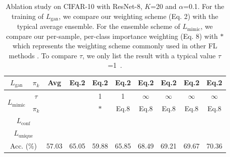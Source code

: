 \documentclass[letterpaper]{article} %
\newcommand{\cmark}{\ding{51}}%
\newcommand{\xmark}{\ding{55}}%
\begin{document}
\begin{table}[b]
\begin{center}
\resizebox{\columnwidth}{!}
{
\begin{tabular}{cc|cccccccc}

\hline
$L_\text{gan}$  &$\pi_k$ &Avg &Eq.2 &Eq.2 &Eq.2 &Eq.2 &Eq.2 &Eq.2 &Eq.2\\ \hline
\multirow{2}{*}{$L_\text{mimic}$} &$\tau$ &\multirow{2}{*}{\xmark} &\multirow{2}{*}{\xmark} &1 & 1 &$\infty$ &$\infty$ &$\infty$ &$\infty$\\
&$\pi_k$ & &  &$*$ &Eq.8 &Eq.8 &Eq.8 &Eq.8 &Eq.8 \\\hline
\multicolumn{2}{c|}{$L_\text{conf}$} &\xmark &\xmark &\xmark &\xmark &\xmark &\cmark &\xmark &\cmark\\\hline
\multicolumn{2}{c|}{$L_\text{unique}$} &\xmark &\xmark &\xmark &\xmark &\xmark &\xmark &\cmark &\cmark\\ \hline
\multicolumn{2}{c|}{Acc. (\%)} &57.03 &65.05 &59.88 &65.85 &68.49 &69.21 &69.67 &70.36 \\
\hline
\end{tabular}}
\end{center}
\caption{Ablation study on CIFAR-10 with ResNet-8, $K$=20 and $\alpha$=0.1. For the training of $L_\text{gan}$, we compare our weighting scheme (Eq. 2) with the typical average ensemble.  For the ensemble scheme of $L_\text{mimic}$, we compare our per-sample, per-class importance weighting (Eq. 8) with $*$ which represents the weighting scheme commonly used in other FL methods \cite{lin2020ensemble, hsu2020federated}. To compare $\tau$, we only list the result with a typical value $\tau$=1~\cite{hinton2015distilling}.}
\label{tab:cifarablation}
\end{table}
\end{document}
